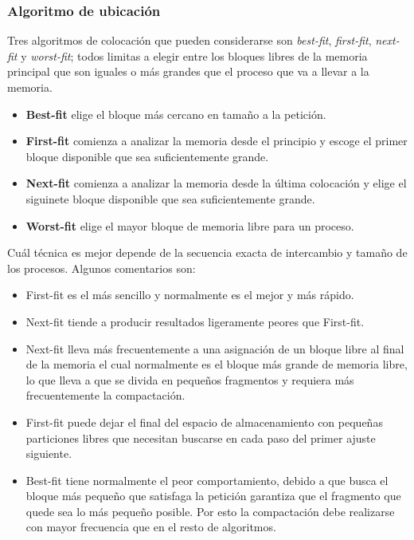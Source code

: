 \documentclass[12pt,a4paper]{article}
\begin{document}
\subsubsection{Algoritmo de ubicación}
Tres algoritmos de colocación que pueden considerarse son \textit{best-fit}, \textit{first-fit}, \textit{next-fit} y \textit{worst-fit}; todos limitas a elegir entre los bloques libres de la memoria principal que son iguales o más grandes que el proceso que va a llevar a la memoria. 
\begin{itemize}
    \item \textbf{Best-fit} elige el bloque más cercano en tamaño a la petición.
    \item \textbf{First-fit} comienza a analizar la memoria desde el principio y escoge el primer bloque disponible que sea suficientemente grande.
    \item \textbf{Next-fit} comienza a analizar la memoria desde la última colocación y elige el siguinete bloque disponible que sea suficientemente grande.
    \item \textbf{Worst-fit} elige el mayor bloque de memoria libre para un proceso.
\end{itemize}
\begin{tcolorbox}[colback=cyan!10, colframe=blue!70, title=Nota]
    Cuál técnica es mejor depende de la secuencia exacta de intercambio y tamaño de los procesos. Algunos comentarios son:
    \begin{itemize}
        \item First-fit es el más sencillo y normalmente es el mejor y más rápido.
        \item Next-fit tiende a producir resultados ligeramente peores que First-fit.
        \item Next-fit lleva más frecuentemente a una asignación de un bloque libre al final de la memoria el cual normalmente es el bloque más grande de memoria libre, lo que lleva a que se divida en pequeños fragmentos y requiera más frecuentemente la compactación.
        \item First-fit puede dejar el final del espacio de almacenamiento con pequeñas particiones libres que necesitan buscarse en cada paso del primer ajuste siguiente.
        \item Best-fit tiene normalmente el peor comportamiento, debido a que busca el bloque más pequeño que satisfaga la petición garantiza que el fragmento que quede sea lo más pequeño posible. Por esto la compactación debe realizarse con mayor frecuencia que en el resto de algoritmos.
    \end{itemize}
\end{tcolorbox}
\end{document}
